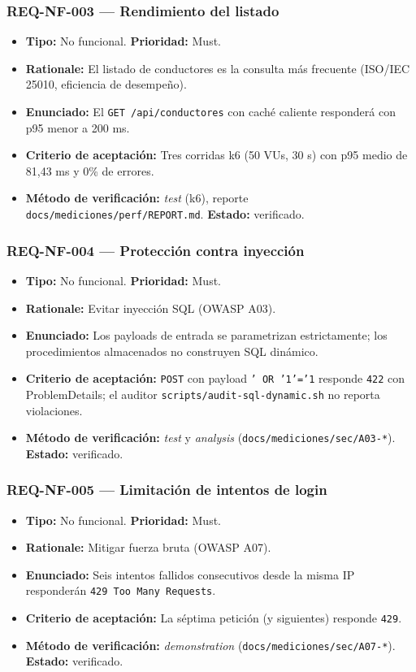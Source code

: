 \documentclass[12pt,a4paper]{article}
\begin{document}
\subsubsection{REQ-NF-003 — Rendimiento del listado}
\begin{itemize}
  \item \textbf{Tipo:} No funcional. \textbf{Prioridad:} Must.
  \item \textbf{Rationale:} El listado de conductores es la consulta más frecuente (ISO/IEC
  25010, eficiencia de desempeño).
  \item \textbf{Enunciado:} El \texttt{GET /api/conductores} con caché caliente responderá
  con p95 menor a 200 ms.
  \item \textbf{Criterio de aceptación:} Tres corridas k6 (50 VUs, 30 s) con p95 medio de
  81,43 ms y 0\% de errores.
  \item \textbf{Método de verificación:} \textit{test} (k6), reporte
  \texttt{docs/mediciones/perf/REPORT.md}. \textbf{Estado:} verificado.
\end{itemize}

\subsubsection{REQ-NF-004 — Protección contra inyección}
\begin{itemize}
  \item \textbf{Tipo:} No funcional. \textbf{Prioridad:} Must.
  \item \textbf{Rationale:} Evitar inyección SQL (OWASP A03).
  \item \textbf{Enunciado:} Los payloads de entrada se parametrizan estrictamente; los
  procedimientos almacenados no construyen SQL dinámico.
  \item \textbf{Criterio de aceptación:} \texttt{POST} con payload \texttt{' OR '1'='1}
  responde \texttt{422} con ProblemDetails; el auditor
  \texttt{scripts/audit-sql-dynamic.sh} no reporta violaciones.
  \item \textbf{Método de verificación:} \textit{test} y \textit{analysis}
  (\texttt{docs/mediciones/sec/A03-*}). \textbf{Estado:} verificado.
\end{itemize}

\subsubsection{REQ-NF-005 — Limitación de intentos de login}
\begin{itemize}
  \item \textbf{Tipo:} No funcional. \textbf{Prioridad:} Must.
  \item \textbf{Rationale:} Mitigar fuerza bruta (OWASP A07).
  \item \textbf{Enunciado:} Seis intentos fallidos consecutivos desde la misma IP responderán
  \texttt{429 Too Many Requests}.
  \item \textbf{Criterio de aceptación:} La séptima petición (y siguientes) responde \texttt{429}.
  \item \textbf{Método de verificación:} \textit{demonstration}
  (\texttt{docs/mediciones/sec/A07-*}). \textbf{Estado:} verificado.
\end{itemize}
\end{document}
